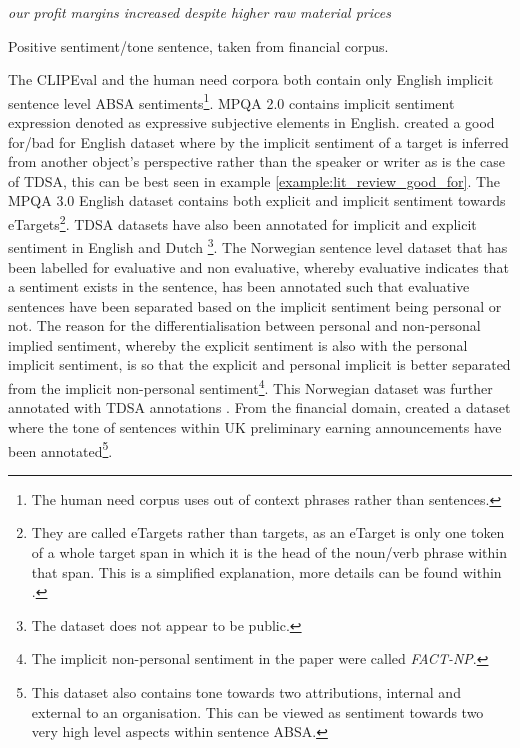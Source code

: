 \begin{example}
\textit{our profit margins increased despite higher raw material prices}
\caption{Positive sentiment/tone sentence, taken from \citet{el-haj-etal-2016-learning} financial corpus.}
\label{example:lit_review_factual_fin_sentiment}
\end{example}

The CLIPEval \citep{russo-etal-2015-semeval} and the human need \citep{ding-riloff-2018-human} corpora both contain only English implicit sentence level ABSA sentiments\footnote{The human need corpus uses out of context phrases rather than sentences.}. MPQA 2.0 \citep{wiebe2005annotating} contains implicit sentiment expression denoted as expressive subjective elements in English. \citet{deng-etal-2013-benefactive} created a good for/bad for English dataset where by the implicit sentiment of a target is inferred from another object's perspective rather than the speaker or writer as is the case of TDSA, this can be best seen in example \ref{example:lit_review_good_for}. The MPQA 3.0 English dataset \citep{deng-wiebe-2015-mpqa} contains both explicit and implicit sentiment towards eTargets\footnote{They are called eTargets rather than targets, as an eTarget is only one token of a whole target span in which it is the head of the noun/verb phrase within that span. This is a simplified explanation, more details can be found within \citet{deng-wiebe-2015-mpqa}.}. TDSA datasets have also been annotated for implicit and explicit sentiment in English \citep{toprak-etal-2010-sentence, van2015good} and Dutch \citep{van2015good}\footnote{The \citet{van2015good} dataset does not appear to be public.}. The Norwegian sentence level dataset \citep{maehlum-etal-2019-annotating} that has been labelled for evaluative and non evaluative, whereby evaluative indicates that a sentiment exists in the sentence, has been annotated such that evaluative sentences have been separated based on the implicit sentiment being personal or not. The reason for the differentialisation between personal and non-personal implied sentiment, whereby the explicit sentiment is also with the personal implicit sentiment, is so that the explicit and personal implicit is better separated from the implicit non-personal sentiment\footnote{The implicit non-personal sentiment in the paper were called \textit{FACT-NP}.}. This Norwegian dataset was further annotated with TDSA annotations \citep{ovrelid2019fine}. From the financial domain, \citet{el-haj-etal-2016-learning} created a dataset where the tone of sentences within UK preliminary earning announcements have been annotated\footnote{This dataset also contains tone towards two attributions, internal and external to an organisation. This can be viewed as sentiment towards two very high level aspects within sentence ABSA.}.

